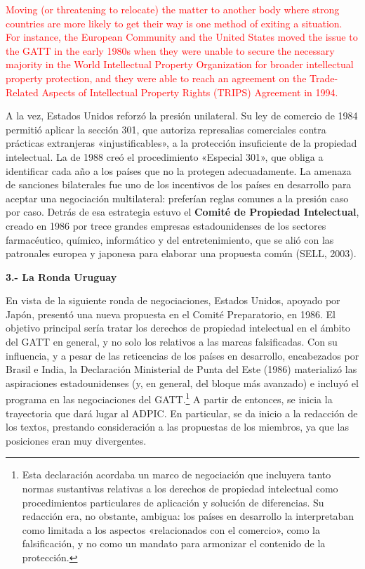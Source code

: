 \documentclass[10pt,a4paper]{article}
\begin{document}
\textcolor{red}{Moving (or threatening to relocate) the matter to another body where strong countries are more likely to get their way is one method of exiting a situation. For instance, the European Community and the United States moved the issue to the GATT in the early 1980s when they were unable to secure the necessary majority in the World Intellectual Property Organization for broader intellectual property protection, and they were able to reach an agreement on the Trade-Related Aspects of Intellectual Property Rights (TRIPS) Agreement in 1994.}

A la vez, Estados Unidos reforzó la presión unilateral. Su ley de comercio de 1984 permitió aplicar la sección 301, que autoriza represalias comerciales contra prácticas extranjeras «injustificables», a la protección insuficiente de la propiedad intelectual. La de 1988 creó el procedimiento «Especial 301», que obliga a identificar cada año a los países que no la protegen adecuadamente. La amenaza de sanciones bilaterales fue uno de los incentivos de los países en desarrollo para aceptar una negociación multilateral: preferían reglas comunes a la presión caso por caso. Detrás de esa estrategia estuvo el \textbf{Comité de Propiedad Intelectual}, creado en 1986 por trece grandes empresas estadounidenses de los sectores farmacéutico, químico, informático y del entretenimiento, que se alió con las patronales europea y japonesa para elaborar una propuesta común (SELL, 2003).

\textbf{3.- La Ronda Uruguay}

En vista de la siguiente ronda de negociaciones, Estados Unidos, apoyado por Japón, presentó una nueva propuesta en el Comité Preparatorio, en 1986. El objetivo principal sería tratar los derechos de propiedad intelectual en el ámbito del GATT en general, y no solo los relativos a las marcas falsificadas. Con su influencia, y a pesar de las reticencias de los países en desarrollo, encabezados por Brasil e India, la Declaración Ministerial de Punta del Este (1986) materializó las aspiraciones estadounidenses (y, en general, del bloque más avanzado) e incluyó el programa en las negociaciones del GATT.\footnote{%
    Esta declaración acordaba un marco de negociación que incluyera tanto normas sustantivas relativas a los derechos de propiedad intelectual como procedimientos particulares de aplicación y solución de diferencias. Su redacción era, no obstante, ambigua: los países en desarrollo la interpretaban como limitada a los aspectos «relacionados con el comercio», como la falsificación, y no como un mandato para armonizar el contenido de la protección.
} A partir de entonces, se inicia la trayectoria que dará lugar al ADPIC. En particular, se da inicio a la redacción de los textos, prestando consideración a las propuestas de los miembros, ya que las posiciones eran muy divergentes.
\end{document}
